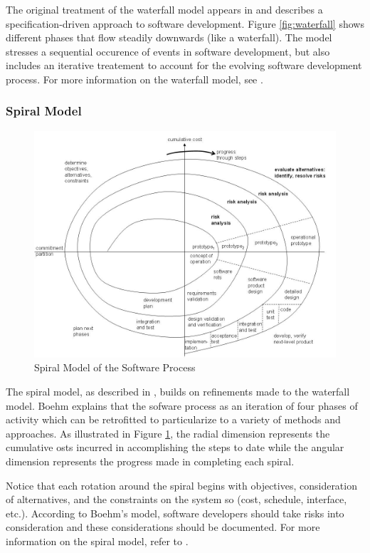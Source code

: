 The original treatment of the waterfall model appears in \cite{Royce1970} and
describes a specification-driven approach to software development. Figure
\ref{fig:waterfall} shows different phases that flow steadily downwards (like a
waterfall). The model stresses a sequential occurence of events in software
development, but also includes an iterative treatement to account for the
evolving software development process. For more information on the waterfall
model, see \cite{Royce1970}.

\subsubsection{Spiral Model}\label{spiral}

\begin{figure}[t]
\begin{narrow}{-1.5in}{-1.5in}
\begin{center}
\includegraphics[scale=0.66]{images/spiral.jpg}
\end{center}
\end{narrow}
\caption{Spiral Model of the Software Process}
\label{fig:spiral}
\end{figure}

The spiral model, as described in \cite{Boehm1986}, builds on refinements made
to the waterfall model. Boehm explains that the sofware process as an iteration
of four phases of activity which can be retrofitted to particularize to a
variety of methods and approaches. As illustrated in Figure \ref{fig:spiral},
the radial dimension represents the cumulative osts incurred in accomplishing
the steps to date while the angular dimension represents the progress made in
completing each spiral.

Notice that each rotation around the spiral begins with objectives,
consideration of alternatives, and the constraints on the system so (cost,
schedule, interface, etc.). According to Boehm's model, software developers
should take risks into consideration and these considerations should be
documented. For more information on the spiral model, refer to \cite{Boehm1986}.
